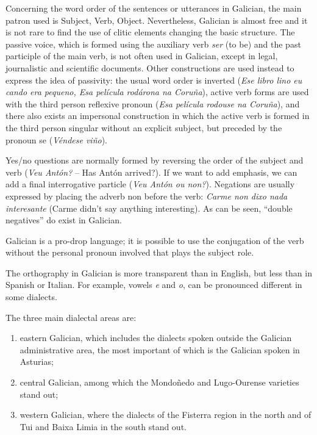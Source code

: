 \begin{multicols}{2}

Concerning the word order of the sentences or utterances in Galician, the main patron used is Subject, Verb, Object. Nevertheless, Galician is almost free and it is not rare to find the use of clitic elements changing the basic structure. The passive voice, which is formed using the auxiliary verb \textit{ser} (to be) and the past participle of the main verb, is not often used in Galician, except in legal, journalistic and scientific documents. Other constructions are used instead to express the idea of passivity: the usual word order is inverted (\textit{Ese libro lino eu cando era pequeno, Esa película rodárona na Coruña}), active verb forms are used with the third person reflexive pronoun (\textit{Esa película rodouse na Coruña}), and there also exists an impersonal construction in which the active verb is formed in the third person singular without an explicit subject, but preceded by the pronoun se (\textit{Véndese viño}).
 
Yes/no questions are normally formed by reversing the order of the subject and verb (\textit{Veu Antón?} – Has Antón arrived?). If we want to add emphasis, we can add a final interrogative particle (\textit{Veu Antón ou non?}). Negations are usually expressed by placing the adverb non before the verb: \textit{Carme non dixo nada interesante} (Carme didn’t say anything interesting). As can be seen, “double negatives” do exist in Galician.

Galician is a pro-drop language; it is possible to use the conjugation of the verb without the personal pronoun involved that plays the subject role.

The orthography in Galician is more transparent than in English, but less than in Spanish or Italian. For example, vowels \textit{e} and \textit{o}, can be pronounced different in some dialects. 

The three main dialectal areas are:

\begin{enumerate}
\item eastern Galician, which includes the dialects spoken outside the Galician administrative area, the most important of which is the Galician spoken in Asturias;
\item central Galician, among which the Mondoñedo and Lugo-Ourense varieties stand out; 
\item western Galician, where the dialects of the Fisterra region in the north and of Tui and Baixa Limia in the south stand out.
\end{enumerate}


\end{multicols}
